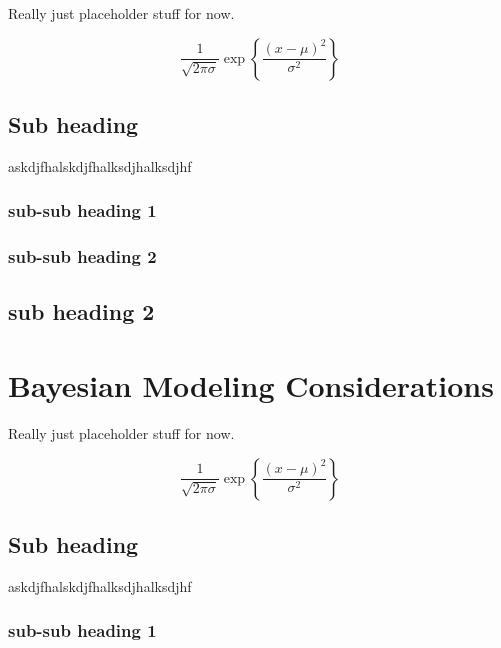 \documentclass[
]{article}
\begin{document}
Really just placeholder stuff for now.

\[
\frac{1}{\sqrt{2\pi\sigma}} \exp{\left\lbrace \frac{(x-\mu)^2}{\sigma^2} \right\rbrace}
\]

\hypertarget{sub-heading}{%
\subsection{Sub heading}\label{sub-heading}}

askdjfhalskdjfhalksdjhalksdjhf

\hypertarget{sub-sub-heading-1}{%
\subsubsection{sub-sub heading 1}\label{sub-sub-heading-1}}

\hypertarget{sub-sub-heading-2}{%
\subsubsection{sub-sub heading 2}\label{sub-sub-heading-2}}

\hypertarget{sub-heading-2}{%
\subsection{sub heading 2}\label{sub-heading-2}}

\hypertarget{bayesian-modeling-considerations}{%
\section{Bayesian Modeling Considerations}\label{bayesian-modeling-considerations}}

Really just placeholder stuff for now.

\[
\frac{1}{\sqrt{2\pi\sigma}} \exp{\left\lbrace \frac{(x-\mu)^2}{\sigma^2} \right\rbrace}
\]

\hypertarget{sub-heading}{%
\subsection{Sub heading}\label{sub-heading}}

askdjfhalskdjfhalksdjhalksdjhf

\hypertarget{sub-sub-heading-1}{%
\subsubsection{sub-sub heading 1}\label{sub-sub-heading-1}}
\end{document}
